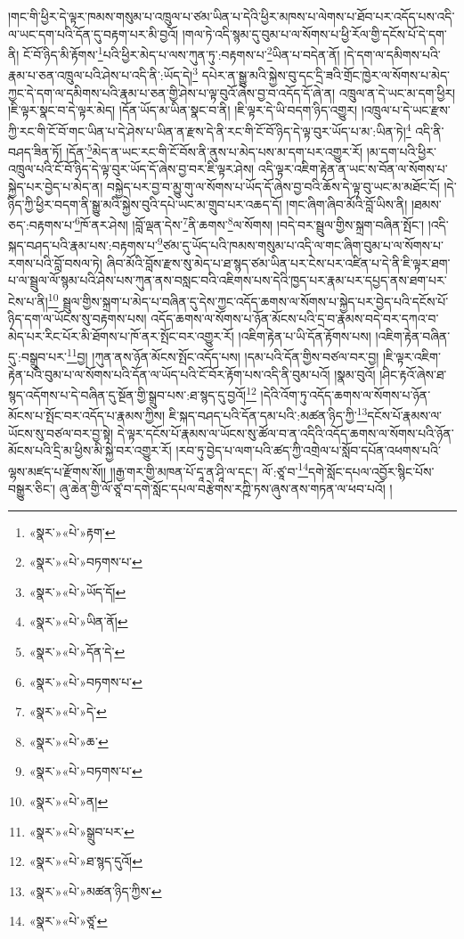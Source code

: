 །གང་གི་ཕྱིར་དེ་ལྟར་ཁམས་གསུམ་པ་འཁྲུལ་པ་ཙམ་ཡིན་པ་དེའི་ཕྱིར་མཁས་པ་ལེགས་པ་ཐོབ་པར་འདོད་པས་འདི་ལ་ཡང་དག་པའི་དོན་དུ་བརྟག་པར་མི་བྱའོ། །གལ་ཏེ་འདི་སྙམ་དུ་བུམ་པ་ལ་སོགས་པ་ཕྱི་རོལ་གྱི་དངོས་པོ་དེ་དག་ནི། ངོ་བོ་ཉིད་མི་རྟོགས་\footnote{«སྣར་»«པེ་»རྟག་}པའི་ཕྱིར་མེད་པ་ལས་ཀུན་ཏུ་:བརྟགས་པ་\footnote{«སྣར་»«པེ་»བཏགས་པ་}ཡིན་པ་བདེན་ནོ། །དེ་དག་ལ་དམིགས་པའི་རྣམ་པ་ཅན་འཁྲུལ་པའི་ཤེས་པ་འདི་ནི་:ཡོད་དེ།\footnote{«སྣར་»«པེ་»ཡོད་དོ།} དཔེར་ན་སྒྱུ་མའི་སྐྱེས་བུ་དང་དྲི་ཟའི་གྲོང་ཁྱེར་ལ་སོགས་པ་མེད་ཀྱང་དེ་དག་ལ་དམིགས་པའི་རྣམ་པ་ཅན་གྱི་ཤེས་པ་ལྟ་བུའོ་ཞེས་བྱ་བ་འདོད་དོ་ཞེ་ན། འཁྲུལ་ན་དེ་ཡང་མ་དག་ཕྱིར། །ཇི་ལྟར་སྣང་བ་དེ་ལྟར་མེད། །དོན་ཡོད་མ་ཡིན་སྣང་བ་ནི། །ཇི་ལྟར་དེ་ཡི་བདག་ཉིད་འགྱུར། །འཁྲུལ་པ་དེ་ཡང་རྫས་ཀྱི་རང་གི་ངོ་བོ་གང་ཡིན་པ་དེ་ཤེས་པ་ཡིན་ན་རྫས་དེ་ནི་རང་གི་ངོ་བོ་ཉིད་དེ་ལྟ་བུར་ཡོད་པ་མ་:ཡིན་ཏེ།\footnote{«སྣར་»«པེ་»ཡིན་ནོ།} འདི་ནི་བཤད་ཟིན་ཏོ། །དོན་\footnote{«སྣར་»«པེ་»དོན་དེ་}མེད་ན་ཡང་རང་གི་ངོ་བོས་ནི་ནུས་པ་མེད་པས་མ་དག་པར་འགྱུར་རོ། །མ་དག་པའི་ཕྱིར་འཁྲུལ་པའི་ངོ་བོ་ཉིད་དེ་ལྟ་བུར་ཡོད་དོ་ཞེས་བྱ་བར་ཇི་ལྟར་ཤེས། འདི་ལྟར་འཇིག་རྟེན་ན་ཡང་ས་བོན་ལ་སོགས་པ་སྐྱེད་པར་བྱེད་པ་མེད་ན། བསྐྱེད་པར་བྱ་བ་མྱུ་གུ་ལ་སོགས་པ་ཡོད་དོ་ཞེས་བྱ་བའི་ཆོས་དེ་ལྟ་བུ་ཡང་མ་མཐོང་ངོ། །དེ་ཉིད་ཀྱི་ཕྱིར་བདག་ནི་སྒྱུ་མའི་སྐྱེས་བུའི་དཔེ་ཡང་མ་གྲུབ་པར་འཆད་དོ། །གང་ཞིག་ཞིབ་མོའི་བློ་ཡིས་ནི། །ཐམས་ཅད་:བརྟགས་པ་\footnote{«སྣར་»«པེ་»བཏགས་པ་}ཁོ་ནར་ཤེས། །བློ་ལྡན་དེས་\footnote{«སྣར་»«པེ་»དེ་}ནི་ཆགས་\footnote{«སྣར་»«པེ་»ཆ་}ལ་སོགས། །བདེ་བར་སྦྲུལ་གྱིས་སྐྲག་བཞིན་སྤོང་། །འདི་སྐད་བཤད་པའི་རྣམ་པས་:བརྟགས་པ་\footnote{«སྣར་»«པེ་»བཏགས་པ་}ཙམ་དུ་ཡོད་པའི་ཁམས་གསུམ་པ་འདི་ལ་གང་ཞིག་བུམ་པ་ལ་སོགས་པ་རགས་པའི་བློ་བསལ་ཏེ། ཞིབ་མོའི་བློས་རྫས་སུ་མེད་པ་ཐ་སྙད་ཙམ་ཡིན་པར་ངེས་པར་འཛིན་པ་དེ་ནི་ཇི་ལྟར་ཐག་པ་ལ་སྦྲུལ་ལོ་སྙམ་པའི་ཤེས་པས་ཀུན་ནས་བསླང་བའི་འཇིགས་པས་དེའི་ཁྱད་པར་རྣམ་པར་དཔྱད་ནས་ཐག་པར་ངེས་པ་ནི།\footnote{«སྣར་»«པེ་»ན།} སྦྲུལ་གྱིས་སྐྲག་པ་མེད་པ་བཞིན་དུ་དེས་ཀྱང་འདོད་ཆགས་ལ་སོགས་པ་སྐྱེད་པར་བྱེད་པའི་དངོས་པོ་ཉིད་དག་ལ་ཡོངས་སུ་བརྟགས་པས། འདོད་ཆགས་ལ་སོགས་པ་ཉོན་མོངས་པའི་དྲ་བ་རྣམས་བདེ་བར་དཀའ་བ་མེད་པར་རིང་པོར་མི་ཐོགས་པ་ཁོ་ནར་སྤོང་བར་འགྱུར་རོ། །འཇིག་རྟེན་པ་ཡི་དོན་རྟོགས་པས། །འཇིག་རྟེན་བཞིན་དུ་:བསྒྲུབ་པར་\footnote{«སྣར་»«པེ་»སྒྲུབ་པར་}བྱ། །ཀུན་ནས་ཉོན་མོངས་སྤོང་འདོད་པས། །དམ་པའི་དོན་གྱིས་བཙལ་བར་བྱ། །ཇི་ལྟར་འཇིག་རྟེན་པའི་བུམ་པ་ལ་སོགས་པའི་དོན་ལ་ཡོད་པའི་ངོ་བོར་རྟོག་པས་འདི་ནི་བུམ་པའོ། །སྣམ་བུའོ། །ཤིང་རྟའོ་ཞེས་ཐ་སྙད་འདོགས་པ་དེ་བཞིན་དུ་སྔོན་གྱི་སྒྲུབ་པས་:ཐ་སྙད་དུ་བྱའོ།\footnote{«སྣར་»«པེ་»ཐ་སྙད་དུའོ།} །དེའི་འོག་ཏུ་འདོད་ཆགས་ལ་སོགས་པ་ཉོན་མོངས་པ་སྤོང་བར་འདོད་པ་རྣམས་ཀྱིས། ཇི་སྐད་བཤད་པའི་དོན་དམ་པའི་:མཚན་ཉིད་ཀྱི་\footnote{«སྣར་»«པེ་»མཚན་ཉིད་ཀྱིས་}དངོས་པོ་རྣམས་ལ་ཡོངས་སུ་བཙལ་བར་བྱ་སྟེ། དེ་ལྟར་དངོས་པོ་རྣམས་ལ་ཡོངས་སུ་ཚོལ་བ་ན་འདིའི་འདོད་ཆགས་ལ་སོགས་པའི་ཉོན་མོངས་པའི་དྲི་མ་ཕྱིས་མི་སྐྱེ་བར་འགྱུར་རོ། །རབ་ཏུ་བྱེད་པ་ལག་པའི་ཚད་ཀྱི་འགྲེལ་པ་སློབ་དཔོན་འཕགས་པའི་ལྷས་མཛད་པ་རྫོགས་སོ།། །།རྒྱ་གར་གྱི་མཁན་པོ་དཱ་ན་ཤཱི་ལ་དང་། ལོ་:ཙཱ་བ་\footnote{«སྣར་»«པེ་»ཙཱ་}དགེ་སློང་དཔལ་འབྱོར་སྙིང་པོས་བསྒྱུར་ཅིང་། ཞུ་ཆེན་གྱི་ལོ་ཙཱ་བ་དགེ་སློང་དཔལ་བརྩེགས་རཀྵི་ཏས་ཞུས་ནས་གཏན་ལ་ཕབ་པའོ། ། 